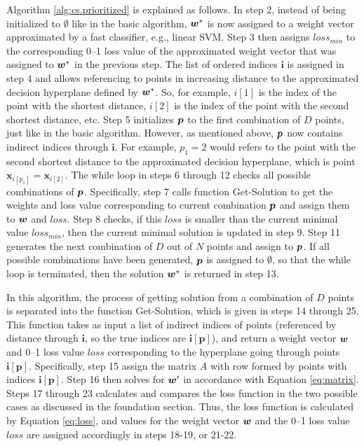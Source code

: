Algorithm \ref{alg:cs.prioritized} is explained as follows. In step 2,
instead of being initialized to $\emptyset$ like in the basic
algorithm, $\boldsymbol{w}^*$ is now assigned to a weight vector approximated by a
fast classifier, e.g., linear SVM. Step 3 then assigns $loss_{min}$ to
the corresponding 0--1 loss value of the approximated weight vector
that was assigned to $\boldsymbol{w}^*$ in the previous step. The list of ordered
indices $\boldsymbol{i}$ is assigned in step 4 and allows referencing
to points in increasing distance to the approximated decision
hyperplane defined by $\boldsymbol{w}^*$. So, for example, $i[1]$ is the index of
the point with the shortest distance, $i[2]$ is the index of the point
with the second shortest distance, etc. Step 5 initializes $\boldsymbol{p}$ to the
first combination of $D$ points, just like in the basic
algorithm. However, as mentioned above, $\boldsymbol{p}$ now contains indirect
indices through $\boldsymbol{i}$. For example, $p_1 = 2$ would refers
to the point with the second shortest distance to the approximated
decision hyperplane, which is point $\boldsymbol{x}_{i[p_1]} =
\boldsymbol{x}_{i[2]}$. The while loop in steps 6 through 12 checks
all possible combinations of $\boldsymbol{p}$. Specifically, step 7 calls function
{\sc Get-Solution} to get the weights and loss value corresponding to
current combination $\boldsymbol{p}$ and assign them to $\boldsymbol{w}$ and $loss$. Step 8
checks, if this $loss$ is smaller than the current minimal value
$loss_{min}$, then the current minimal solution is updated in step
9. Step 11 generates the next combination of $D$ out of $N$ points and
assign to $\boldsymbol{p}$. If all possible combinations have been generated, $\boldsymbol{p}$
is assigned to $\emptyset$, so that the while loop is terminated, then
the solution $\boldsymbol{w}^*$ is returned in step 13.

In this algorithm, the process of getting solution from a combination
of $D$ points is separated into the function {\sc Get-Solution}, which
is given in steps 14 through 25. This function takes as input a list
of indirect indices of points (referenced by distance through
$\boldsymbol{i}$, so the true indices are $\boldsymbol{i[p]}$), and
return a weight vector $\boldsymbol{w}$ and 0--1 loss value $loss$ corresponding
to the hyperplane going through points
$\boldsymbol{i[p]}$. Specifically, step 15 assign the matrix $A$ with
row formed by points with indices $\boldsymbol{i[p]}$. Step 16 then
solves for $\boldsymbol{w}'$ in accordance with Equation \ref{eq:matrix}. Steps 17
through 23 calculates and compares the loss function in the two
possible cases as discussed in the foundation section. Thus, the loss
function is calculated by Equation \ref{eq:loss}, and values for the
weight vector $\boldsymbol{w}$ and the 0--1 loss value $loss$ are assigned
accordingly in steps 18-19, or 21-22.


